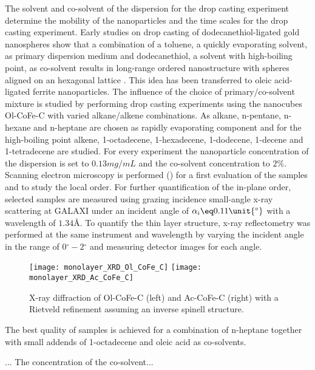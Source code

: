 \documentclass[\main/dresen_thesis.tex]{subfiles}
\begin{document}
  The solvent and co-solvent of the dispersion for the drop casting experiment determine the mobility of the nanoparticles and the time scales for the drop casting experiment.
  Early studies on drop casting of dodecanethiol-ligated gold nanospheres show that a combination of a toluene, a quickly evaporating solvent, as primary dispersion medium and dodecanethiol, a solvent with high-boiling point, as co-solvent results in long-range ordered nanostructure with spheres aligned on an hexagonal lattice \cite{Bigioni_2006_Kinet}.
  This idea has been transferred to oleic acid-ligated ferrite nanoparticles.
  The influence of the choice of primary/co-solvent mixture is studied by performing drop casting experiments using the nanocubes Ol-CoFe-C with varied alkane/alkene combinations.
  As alkane, n-pentane, n-hexane and n-heptane are chosen as rapidly evaporating component and for the high-boiling point alkene, 1-octadecene, 1-hexadecene, 1-dodecene, 1-decene and 1-tetradecene are studied.
  For every experiment the nanoparticle concentration of the dispersion is set to $0.13 \unit{mg/mL}$ and the co-solvent concentration to $2\unit{\%}$.
  Scanning electron microscopy is performed () for a first evaluation of the samples and to study the local order.
  For further quantification of the in-plane order, selected samples are measured using grazing incidence small-angle x-ray scattering at GALAXI under an incident angle of $\alpha_i \eq 0.11 \unit{^\circ}$ with a wavelength of $1.34 \unit{\angstrom}$.
  To quantify the thin layer structure, x-ray reflectometry was performed at the same instrument and wavelength by varying the incident angle in the range of $0\unit{^\circ} - 2\unit{^\circ}$ and measuring detector images for each angle.

  \begin{figure}[tb]
    \centering
    \texttt{[image: monolayer\_XRD\_Ol\_CoFe\_C]}
    \texttt{[image: monolayer\_XRD\_Ac\_CoFe\_C]}
    \caption{\label{fig:monolayers:nanoparticle:xrd}X-ray diffraction of Ol-CoFe-C (left) and Ac-CoFe-C (right) with a Rietveld refinement assuming an inverse spinell structure.}
  \end{figure}


  The best quality of samples is achieved for a combination of n-heptane together with small addends of 1-octadecene and oleic acid as co-solvents.


  ...
  The concentration of the co-solvent...  

  
\end{document}
